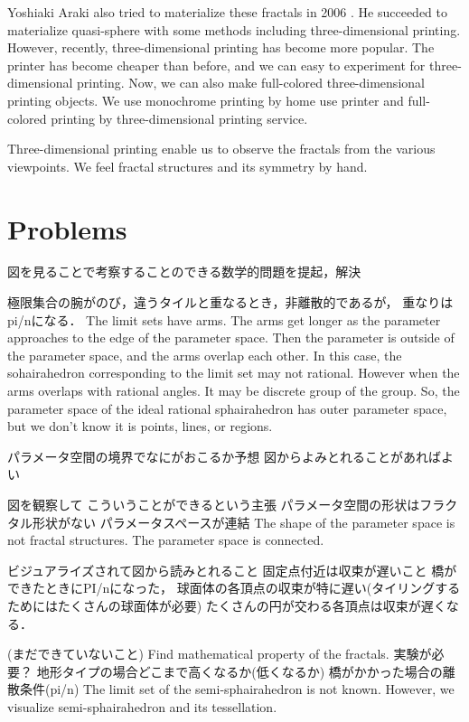 \documentclass[dvipdfmx]{interact}
\theoremstyle{plain}%
\theoremstyle{definition}
\theoremstyle{remark}
\theoremstyle{problemstyle}
\begin{document}
Yoshiaki Araki also tried to materialize these fractals in 2006
\cite{araki2006materializing}.
He succeeded to materialize quasi-sphere with some methods including
three-dimensional printing.
However, recently, three-dimensional printing has become more popular.
The printer has become cheaper than before, and we can easy to
experiment for three-dimensional printing.
Now, we can also make full-colored three-dimensional printing objects.
We use monochrome printing by home use printer and full-colored
printing by three-dimensional printing service.

Three-dimensional printing enable us to observe the fractals from the
various viewpoints.
We feel fractal structures and its symmetry by hand.

\section{Problems}
図を見ることで考察することのできる数学的問題を提起，解決

極限集合の腕がのび，違うタイルと重なるとき，非離散的であるが，
重なりはpi/nになる．
The limit sets have arms. The arms get longer as the parameter approaches
to the edge of the parameter space.
Then the parameter is outside of the parameter space, and the
arms overlap each other.
In this case, the sohairahedron corresponding to the limit set may not
rational.
However when the arms overlaps with rational angles.
It may be discrete group of the group.
So, the parameter space of the ideal rational sphairahedron has outer
parameter space, but we don't know it is points, lines, or regions.

パラメータ空間の境界でなにがおこるか予想
図からよみとれることがあればよい

図を観察して こういうことができるという主張
パラメータ空間の形状はフラクタル形状がない
パラメータスペースが連結
The shape of the parameter space is not fractal structures.
The parameter space is connected.

ビジュアライズされて図から読みとれること
固定点付近は収束が遅いこと
橋ができたときにPI/nになった，
球面体の各頂点の収束が特に遅い(タイリングするためにはたくさんの球面体が必要)
たくさんの円が交わる各頂点は収束が遅くなる．

(まだできていないこと)
Find mathematical property of the fractals.
実験が必要？
地形タイプの場合どこまで高くなるか(低くなるか)
橋がかかった場合の離散条件(pi/n)
The limit set of the semi-sphairahedron is not known.
However, we visualize semi-sphairahedron and its tessellation.
\end{document}
